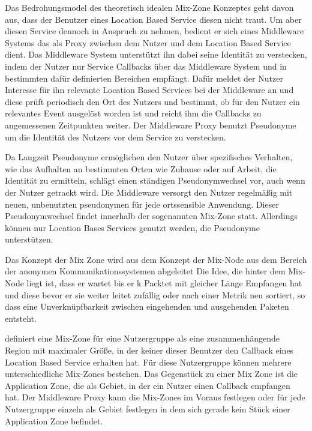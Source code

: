 Das Bedrohungsmodel des theoretisch idealen Mix-Zone  Konzeptes \cite{Beresford2003} geht davon aus, dass der Benutzer eines Location Based Service diesen  nicht traut. Um aber diesen Service dennoch in Anspruch zu nehmen,  bedient er sich eines Middleware Systems  das als Proxy zwischen dem Nutzer und dem Location Based Service dient. Das Middleware System unterstützt ihn dabei seine Identität zu verstecken, indem der Nutzer  nur Service Callbacks über das Middleware System und in bestimmten dafür definierten Bereichen empfängt. Dafür meldet der Nutzer Interesse für ihn relevante Location Based Services bei der Middleware an und diese prüft periodisch den Ort des Nutzers und bestimmt, ob für den Nutzer ein relevantes Event ausgelöst worden ist und reicht ihm die Callbacks zu angemessenen Zeitpunkten weiter. Der Middleware Proxy benutzt Pseudonyme um die Identität des Nutzers vor dem Service zu verstecken.

Da Langzeit Pseudonyme  ermöglichen den Nutzer über spezifisches Verhalten, wie das Aufhalten an bestimmten Orten wie Zuhause oder auf Arbeit, die Identität zu ermitteln, schlägt \cite{Beresford2003} einen ständigen Pseudonymwechsel vor, auch wenn der Nutzer getrackt wird. Die Middleware versorgt den Nutzer regelmäßig mit neuen, unbenutzten pseudonymen für jede ortssensible Anwendung. Dieser Pseudonymwechsel findet innerhalb der sogenannten Mix-Zone statt. Allerdings können nur Location Bases Services genutzt werden, die Pseudonyme unterstützen.

Das Konzept der Mix Zone wird aus dem Konzept der Mix-Node aus dem Bereich der anonymen Kommunikationssystemen abgeleitet \cite{Chow2011}   Die Idee, die hinter dem Mix-Node liegt ist, dass er wartet bis er k Packtet mit gleicher Länge Empfangen hat und diese bevor er sie weiter leitet zufällig oder nach einer Metrik neu sortiert, so dass eine Unverknüpfbarkeit zwischen eingehenden und ausgehenden Paketen  entsteht.

\cite{Beresford2003} definiert eine Mix-Zone für eine Nutzergruppe als eine zusammenhängende Region mit maximaler Größe, in der keiner dieser Benutzer den Callback eines Location Based Service erhalten hat. Für diese Nutzergruppe können mehrere unterschiedliche Mix-Zones bestehen. Das Gegenstück zu einer Mix Zone ist die Application Zone, die als Gebiet, in der ein Nutzer einen Callback empfangen hat. Der Middleware Proxy kann die Mix-Zones im Voraus festlegen oder für jede Nutzergruppe einzeln als Gebiet festlegen in dem sich gerade kein Stück einer Application Zone befindet.


